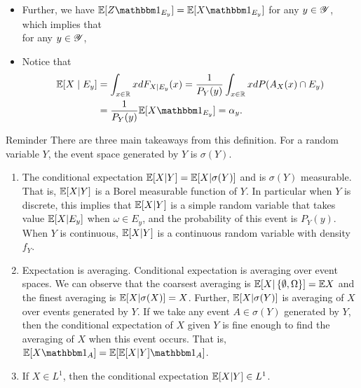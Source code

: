 \documentclass[12pt,aspectratio=169]{beamer}
\begin{document}
\begin{frame}
\begin{Example}
\begin{itemize}
\item <1-> Further, we have $\E[Z\Ind{E_y}] = \E[X\Ind{E_y}]$ for any $y \in \mathscr{Y}$, 
which implies that \\
for any $y \in \mathscr{Y}$, 
\item <2-> Notice that 
\begin{align*}
\E[X\mid E_y] 
&= \int_{x\in\R}x dF_{X\mid E_y}(x) 
= \frac{1}{P_Y(y)}\int_{x\in\R}x d P(A_X(x)\cap E_y)\\
&= \frac{1}{P_Y(y)}\E[X\Ind{E_y}]
= \alpha_y.
\end{align*}
\end{itemize}
\end{Example}
\end{frame}

\begin{frame}
\begin{block}{Reminder} 
There are three main takeaways from this definition. 
For a random variable $Y$, 
the event space generated by $Y$ is $\sigma(Y)$.  
\begin{enumerate}
\item <1->
The conditional expectation $\mathbb{E}[X|Y] = \mathbb{E}[X|\sigma(Y)]$ and is $\sigma(Y)$ measurable. 
That is, $\mathbb{E}[X|Y]$ is a Borel measurable function of $Y$. 
In particular when $Y$ is discrete, this implies that $\mathbb{E}[X|Y]$ is a simple random variable that takes value $\mathbb{E}[X|E_y]$ when $\omega \in E_y$, and the probability of this event is $P_Y(y)$. 
When $Y$ is continuous, $\mathbb{E}[X|Y]$ is a continuous random variable with density $f_Y$. 

\item <2-> Expectation is averaging. 
Conditional expectation is averaging over event spaces. 
We can observe that the coarsest averaging is $\mathbb{E}[X|\left\{\emptyset, \Omega\right\}] = \mathbb{E} X$ 
and the finest averaging is $\mathbb{E}[X|\sigma(X)] = X$. 
Further, $\mathbb{E}[X|\sigma(Y)]$ is averaging of $X$ over events generated by $Y$.   
If we take any event $A \in \sigma(Y)$ generated by $Y$, 
then the conditional expectation of $X$ given $Y$ is fine enough to find the averaging of $X$ when this event occurs.   
That is, $\E[X\Ind{A}] = \E[\E[X|Y]\Ind{A}]$.

\item <3-> If $X \in L^1$, then the conditional expectation $\mathbb{E}[X|Y] \in L^1$. 
\end{enumerate}
\end{block}
\end{frame}
\end{document}
